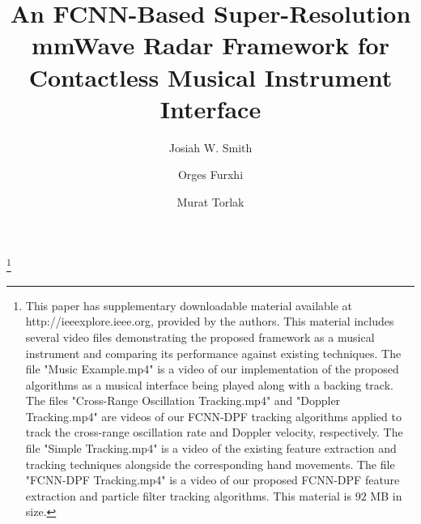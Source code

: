 \documentclass[10pt,journal,final]{IEEEtran}
\newcommand\blfootnote[1]{%
  \begingroup
  \renewcommand\thefootnote{}\footnote{#1}%
  \addtocounter{footnote}{-1}%
  \endgroup
}
\begin{document}
\title{An FCNN-Based Super-Resolution mmWave Radar Framework for Contactless Musical Instrument Interface}

\author[1]{Josiah W. Smith}
\author[2]{Orges Furxhi}
\author[1]{Murat Torlak}

\maketitle

\blfootnote{This paper has supplementary downloadable material available at http://ieeexplore.ieee.org, provided by the authors. 
This material includes several video files demonstrating the proposed framework as a musical instrument and comparing its performance against existing techniques. 
The file "Music Example.mp4" is a video of our implementation of the proposed algorithms as a musical interface being played along with a backing track.
The files "Cross-Range Oscillation Tracking.mp4" and "Doppler Tracking.mp4" are videos of our FCNN-DPF tracking algorithms applied to track the cross-range oscillation rate and Doppler velocity, respectively. 
The file "Simple Tracking.mp4" is a video of the existing feature extraction and tracking techniques alongside the corresponding hand movements. 
The file "FCNN-DPF Tracking.mp4" is a video of our proposed FCNN-DPF feature extraction and particle filter tracking algorithms.
This material is $92$ MB in size.
}
\end{document}
